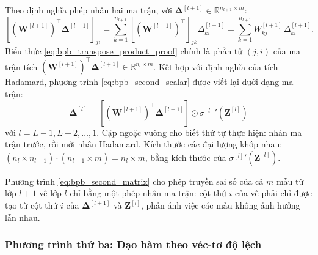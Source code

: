 Theo định nghĩa phép nhân hai ma trận, với $\boldsymbol{\Delta}^{[l+1]} \in \mathbb{R}^{n_{l+1} \times m}$:
\begin{equation}
\left[ \left(\mathbf{W}^{[l+1]}\right)^{\top}\boldsymbol{\Delta}^{[l+1]} \right]_{ji} = \sum_{k=1}^{n_{l+1}} \left[\left(\mathbf{W}^{[l+1]}\right)^{\top}\right]_{jk}\Delta_{ki}^{[l+1]} = \sum_{k=1}^{n_{l+1}} W_{kj}^{[l+1]}\,\Delta_{ki}^{[l+1]}.
\label{eq:bpb_transpose_product_proof}
\end{equation}
Biểu thức \eqref{eq:bpb_transpose_product_proof} chính là phần tử $(j,i)$ của ma trận tích $\left(\mathbf{W}^{[l+1]}\right)^{\top}\boldsymbol{\Delta}^{[l+1]} \in \mathbb{R}^{n_l \times m}$. Kết hợp với định nghĩa của tích Hadamard, phương trình \eqref{eq:bpb_second_scalar} được viết lại dưới dạng ma trận:
\begin{equation}
\boxed{
\boldsymbol{\Delta}^{[l]} = \left[ \left(\mathbf{W}^{[l+1]}\right)^{\top}\boldsymbol{\Delta}^{[l+1]} \right] \odot {\sigma^{[l]}}'\!\left(\mathbf{Z}^{[l]}\right)
}
\label{eq:bpb_second_matrix}
\end{equation}
với $l = L-1, L-2, \dots, 1$. Cặp ngoặc vuông cho biết thứ tự thực hiện: nhân ma trận trước, rồi mới nhân Hadamard. Kích thước các đại lượng khớp nhau: $(n_l \times n_{l+1})\cdot(n_{l+1} \times m) = n_l \times m$, bằng kích thước của ${\sigma^{[l]}}'\!\left(\mathbf{Z}^{[l]}\right)$.
 
Phương trình \eqref{eq:bpb_second_matrix} cho phép truyền sai số của cả $m$ mẫu từ lớp $l+1$ về lớp $l$ chỉ bằng một phép nhân ma trận: cột thứ $i$ của vế phải chỉ được tạo từ cột thứ $i$ của $\boldsymbol{\Delta}^{[l+1]}$ và $\mathbf{Z}^{[l]}$, phản ánh việc các mẫu không ảnh hưởng lẫn nhau.

\subsubsection{Phương trình thứ ba: Đạo hàm theo véc-tơ độ lệch}
 
